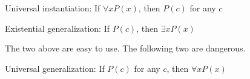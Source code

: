 \begin{defn}

Universal instantiation: If $\forall x P(x)$, then $P(c)$ for any $c$

\end{defn}

\begin{defn}

Existential generalization: If $P(c)$, then $\exists x P(x)$

\end{defn}

The two above are easy to use. The following two are dangerous.

\begin{defn}

Universal generalization: If $P(c)$ for any $c$, then $\forall x P(x)$

\end{defn}

